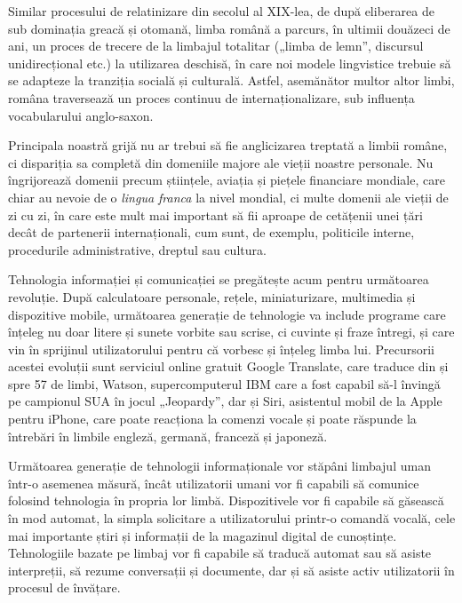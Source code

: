 \begin{multicols}{2}
Similar procesului de relatinizare din secolul al \mbox{XIX-lea}, de după eliberarea de sub dominația greacă și otomană, limba română a parcurs, în ultimii douăzeci de ani, un proces de trecere de la limbajul totalitar („limba de lemn”, discursul unidirecțional etc.) la utilizarea deschisă, în care noi modele lingvistice trebuie să se adapteze la tranziția socială și culturală. Astfel, asemănător multor altor limbi, româna traversează un proces continuu de internaționalizare, sub influența vocabularului anglo-saxon.

Principala noastră grijă nu ar trebui să fie anglicizarea treptată a limbii române, ci dispariția sa completă din domeniile majore ale vieții noastre personale. Nu îngrijorează domenii precum științele, aviația și piețele financiare mondiale, care chiar au nevoie de o \textit{lingua franca} la nivel mondial, ci multe domenii ale vieții de zi cu zi, în care este mult mai important să fii aproape de cetățenii unei țări decât de partenerii internaționali, cum sunt, de exemplu, politicile interne, procedurile administrative, dreptul sau cultura.

Tehnologia informației și comunicației se pregătește acum pentru următoarea revoluție. După calculatoare personale, rețele, miniaturizare, multimedia și dispozitive mobile, următoarea generație de tehnologie va include programe care înțeleg nu doar litere și sunete vorbite sau scrise, ci cuvinte și fraze întregi, și care vin în sprijinul utilizatorului pentru că vorbesc și înțeleg limba lui. Precursorii acestei evoluții sunt serviciul online gratuit Google Translate, care traduce din și spre 57 de limbi, Watson, supercomputerul IBM care a fost capabil să-l învingă pe campionul SUA în jocul „Jeopardy”, dar și Siri, asistentul mobil de la Apple pentru iPhone, care poate reacționa la comenzi vocale și poate răspunde la întrebări în limbile engleză, germană, franceză și japoneză.

Următoarea generație de tehnologii informaționale vor stăpâni limbajul uman \mbox{într-o} asemenea măsură, încât utilizatorii umani vor fi capabili să comunice folosind tehnologia în propria lor limbă. Dispozitivele vor fi capabile să găsească în mod automat, la simpla solicitare a utilizatorului \mbox{printr-o} comandă vocală, cele mai importante știri și informații de la magazinul digital de cunoștințe. Tehnologiile bazate pe limbaj vor fi capabile să traducă automat sau să asiste interpreții, să rezume conversații și documente, dar și să asiste activ utilizatorii în procesul de învățare.


\end{multicols}
